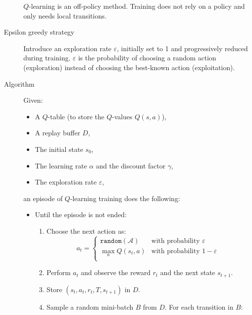 \begin{description}
        \begin{remark}
            $Q$-learning is an off-policy method. Training does not rely on a policy and only needs local transitions.
        \end{remark}

    \item[Epsilon greedy strategy] 
        Introduce an exploration rate $\varepsilon$, initially set to 1 and progressively reduced during training.
        $\varepsilon$ is the probability of choosing a random action (exploration) instead of choosing the best-known action (exploitation).

    \item[Algorithm] 
        Given:
        \begin{itemize}
            \item A $Q$-table (to store the $Q$-values $Q(s, a)$), 
            \item A replay buffer $D$,
            \item The initial state $s_0$,
            \item The learning rate $\alpha$ and the discount factor $\gamma$,
            \item The exploration rate $\varepsilon$, 
        \end{itemize}
        an episode of $Q$-learning training does the following:
        \begin{itemize}
            \item Until the episode is not ended:
            \begin{enumerate}
                \item Choose the next action as:
                    \[ a_t = \begin{cases}
                        \texttt{random}(\mathcal{A}) & \text{with probability $\varepsilon$} \\
                        \max_a Q(s_t, a) & \text{with probability $1-\varepsilon$} \\
                    \end{cases} \]
                \item Perform $a_t$ and observe the reward $r_t$ and the next state $s_{t+1}$.
                \item Store $(s_t, a_t, r_t, T, s_{t+1})$ in $D$.
                \item Sample a random mini-batch $B$ from $D$. For each transition in $B$:
                \begin{enumerate}

\end{enumerate}
\end{enumerate}
\end{itemize}
\end{description}
